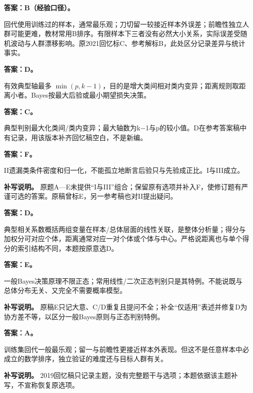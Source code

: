 
\textbf{答案：B（经验口径）。}

回代使用训练过的样本，通常最乐观；刀切留一较接近样本外误差；前瞻性独立人群可能更难，教材常用B排序。有限样本下三者没有必然大小关系，实际误差受随机波动与人群漂移影响。原2021回忆标C、参考解标B，此处区分记录差异与统计事实。



\textbf{答案：D。}

有效典型轴最多 \(\min(p,k-1)\)，目的是增大类间相对类内变异；距离规则取距离小者。Bayes按最大后验或最小期望损失决策。



\textbf{答案：C。}

典型判别最大化类间/类内变异；最大轴数为k−1与p的较小值。D在参考答案稿中有记录，用该版本补齐回忆稿空白，不是新编。



\textbf{答案：F。}

II遗漏类条件密度和归一化，不能孤立地断言后验只与先验成正比。I与III成立。


\textbf{补写说明。} 原题A---E未提供``I与III''组合；保留原有选项并补入F，使修订题有严谨可选的答案。原稿曾标E，另一参考稿也对II提出疑问。



\textbf{答案：D。}

典型相关系数概括两组变量在样本/总体层面的线性关联，是整体分析量；得分与加权分可对应个体，距离通常对应一对个体或个体与中心。严格说距离也与单个得分的索引结构不同，本题按原意选D。



\textbf{答案：E。}

一般Bayes决策原理不限正态；常用线性/二次正态判别只是其特例。不能说既与总体分布无关、又完全不需要概率模型。


\textbf{补写说明。} 原稿E只记大意、C/D重复且提问不全；补全``仅适用''表述并修复D为协方差不等，以区分一般Bayes原则与正态判别特例。



\textbf{答案：A。}

训练集回代一般最乐观；留一与前瞻性更接近样本外表现。但这不是任意样本中必成立的数学排序，独立验证的难度还与目标人群有关。


\textbf{补写说明。} 2019回忆稿只记录主题，没有完整题干与选项；本题依据该主题补写，不宣称恢复原选项。



